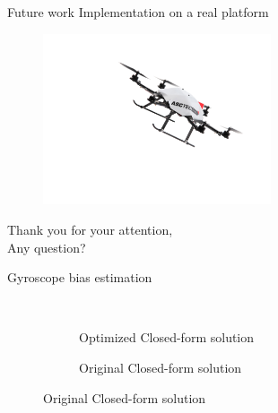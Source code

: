 \documentclass{beamer}
\begin{document}
\begin{frame}{Future work}
  Implementation on a real platform
  \begin{figure}[h!]
    \centering
    \includegraphics[width=0.6\textwidth]{images/drone.png}
  \end{figure}

\end{frame}

\begin{frame}[plain,c]
  \begin{center}
    Thank you for your attention,\\
    Any question?
  \end{center}
\end{frame}

\begin{frame}[noframenumbering]{Gyroscope bias estimation}
  \begin{figure}[h!]
    \centering

    \begin{subfigure}[b]{0.78\textwidth}
      \caption{Optimized Closed-form solution}
      \resizebox{0.45\textwidth}{!}{} ~
      \resizebox{0.45\textwidth}{!}{}
    \end{subfigure}

    \begin{subfigure}[b]{0.35\textwidth}
      \caption{Original Closed-form solution}
      \resizebox{\textwidth}{!}{}
    \end{subfigure}

  \end{figure}
\end{frame}
\end{document}
